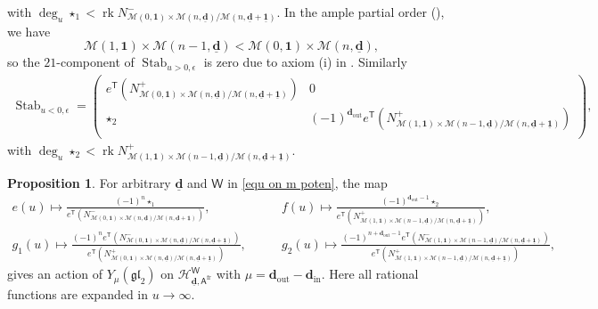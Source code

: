 \documentclass[10pt]{amsart}
\theoremstyle{definition}
\newtheorem{Proposition}[Theorem]{Proposition}
\numberwithin{equation}{section}
\newcommand{\bd}{\mathbf{d}}
\newcommand{\cM}{\mathcal{M}}
\newcommand{\sA}{\mathsf{A}}
\newcommand{\sT}{\mathsf{T}}
\newcommand{\sW}{\mathsf{W}}
\newcommand{\rk}{\operatorname{rk}}
\newcommand{\Stab}{\operatorname{Stab}}
\newcommand{\In}{\operatorname{in}}
\newcommand{\Out}{\operatorname{out}}
\begin{document}
with $\deg_u\star_1<\rk N^-_{\scriptscriptstyle\cM(0,\mathbf 1)\times \cM(n,\underline{\bd})/\cM(n,\underline{\bd}+\underline{\mathbf 1})}$. 
In the ample partial order (\cite[Rmk.~3.8]{COZZ}), we have 
$$\cM(1,\mathbf 1)\times \cM(n-1,\underline{\bd})< \cM(0,\mathbf 1)\times \cM(n,\underline{\bd}), $$
so the 
$21$-component of $\Stab_{u>0,\epsilon}$ is zero due to axiom (i) in \cite[Def.~3.4]{COZZ}. Similarly
\begin{align*}
\Stab_{u<0,\epsilon}=\left(
\begin{array}{cc}
e^{\sT}(N^+_{\scriptscriptstyle \cM(0,\mathbf 1)\times \cM(n,\underline{\bd})/\cM(n,\underline{\bd}+\underline{\mathbf 1})}) & 0 \\
 \star_2 & (-1)^{\bd_{\Out}}e^{\sT}(N^+_{\scriptscriptstyle\cM(1,\mathbf 1)\times \cM(n-1,\underline{\bd})/\cM(n,\underline{\bd}+\underline{\mathbf 1})}) \\
\end{array}
\right),
\end{align*}
with $\deg_u\star_2<\rk N^+_{\scriptscriptstyle\cM(1,\mathbf 1)\times \cM(n-1,\underline{\bd})/\cM(n,\underline{\bd}+\underline{\mathbf 1})}$. 

\begin{Proposition}\label{prop shifted Y(gl(2)) action}
For arbitrary $\underline{\bd}$ and $\sW$ in \eqref{equ on m poten}, the map 
\begin{equation}\label{image of generators}
\begin{split}
e(u)\mapsto \frac{(-1)^n\star_1}{  e^{\sT}(N^-_{\scriptscriptstyle \cM(0,\mathbf 1)\times \cM(n,\underline{\bd})/\cM(n,\underline{\bd}+\underline{\mathbf 1})})}, &\qquad f(u)\mapsto \frac{(-1)^{\bd_{\Out}-1}\star_2}{e^{\sT}(N^+_{\scriptscriptstyle\cM(1,\mathbf 1)\times \cM(n-1,\underline{\bd})/\cM(n,\underline{\bd}+\underline{\mathbf 1})})},\\
g_1(u)\mapsto \frac{(-1)^ne^{\sT}(N^-_{\scriptscriptstyle \cM(0,\mathbf 1)\times \cM(n,\underline{\bd})/\cM(n,\underline{\bd}+\underline{\mathbf 1})})}{ e^{\sT}(N^+_{\scriptscriptstyle \cM(0,\mathbf 1)\times \cM(n,\underline{\bd})/\cM(n,\underline{\bd}+\underline{\mathbf 1})}) },&\qquad g_2(u)\mapsto \frac{(-1)^{n+\bd_{\Out}-1}e^{\sT}(N^-_{\scriptscriptstyle\cM(1,\mathbf 1)\times \cM(n-1,\underline{\bd})/\cM(n,\underline{\bd}+\underline{\mathbf 1})})}{e^{\sT}(N^+_{\scriptscriptstyle\cM(1,\mathbf 1)\times \cM(n-1,\underline{\bd})/\cM(n,\underline{\bd}+\underline{\mathbf 1})})},
\end{split}
\end{equation}
gives an action of $Y_{\mu}(\mathfrak{gl}_2)$ on $\mathcal H^{\sW}_{\underline{\bd},\sA^{\mathrm{fr}}}$ with $\mu=\bd_{\Out}-\bd_{\In}$. Here all rational functions are expanded in $u\to \infty$.
\end{Proposition}
\end{document}
